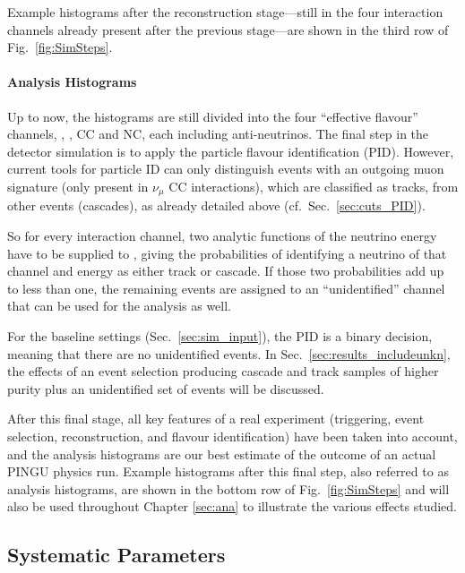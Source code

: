Example histograms after the reconstruction stage---still in the four
interaction channels already present after the previous stage---are shown in
the third row of Fig.~\ref{fig:SimSteps}.

\paragraph{Analysis Histograms}

Up to now, the histograms are still divided into the four ``effective flavour''
channels, \nue, \numu, \nutau CC and \nux NC, each including
anti-neutrinos. The final step in the detector simulation is to apply the
particle flavour identification (PID). However, current tools for particle ID
can only distinguish events with an outgoing muon signature (only present in
$\nu_\mu$ CC interactions), which are classified as tracks, from other events
(cascades), as already detailed above (cf.\ Sec.~\ref{sec:cuts_PID}).

So for every interaction channel, two analytic functions of the neutrino
energy have to be supplied to \papa, giving the probabilities of identifying a
neutrino of that channel and energy as either track or cascade. If those two
probabilities add up to less than one, the remaining events are assigned to an
``unidentified'' channel that can be used for the analysis as well.

For the baseline settings (Sec.~\ref{sec:sim_input}), the PID is a binary
decision, meaning that there are no unidentified events. In
Sec.~\ref{sec:results_includeunkn}, the effects of an event selection producing
cascade and track samples of higher purity plus an unidentified set of events
will be discussed.

After this final stage, all key features of a real experiment (triggering,
event selection, reconstruction, and flavour identification) have been taken
into account, and the analysis histograms are our best estimate of the outcome
of an actual PINGU physics run. Example histograms after this final step, also
referred to as analysis histograms, are shown in the bottom row of
Fig.~\ref{fig:SimSteps} and will also be used throughout Chapter \ref{sec:ana}
to illustrate the various effects studied.


\subsection{Systematic Parameters}
\label{sec:systematics}

